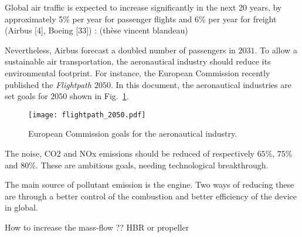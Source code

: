 Global air traffic is expected to increase significantly in the next 20 years, 
by approximately 5\% per year for passenger flights and 6\% 
per year for freight (Airbus [4], Boeing [33]) : (thèse vincent blandeau)


Nevertheless, Airbus forecast a doubled number of passengers in
$2031$. To allow a sustainable air transportation, the aeronautical
industry should reduce its environmental footprint. For instance,
the European Commission recently published the \emph{Flightpath $2050$}.
In this document, the aeronautical industries are set goals for $2050$
shown in Fig.~\ref{fig:flightpath_2050}.
\begin{figure}[htbp]
  \centering
  \texttt{[image: flightpath\_2050.pdf]}
  \caption{European Commission goals for the aeronautical industry. }
  \label{fig:flightpath_2050}
\end{figure}
The noise, CO2 and NOx emissions should be reduced of 
respectively $65\%$, $75\%$ and $80\%$.
These are ambitious goals, needing technological breakthrough.

The main source of pollutant emission is the engine. Two ways of reducing
these are through a better control of the combustion and better
efficiency of the device in global.

How to increase the mass-flow ??
HBR or propeller